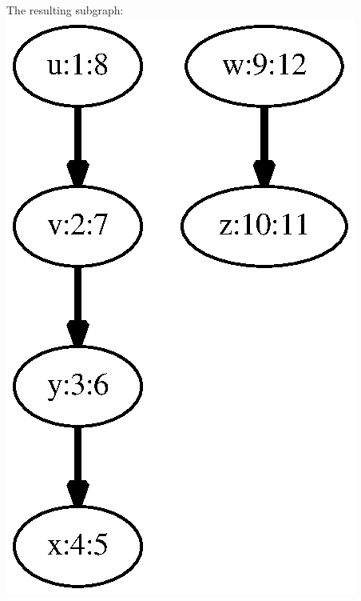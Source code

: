 \documentclass{article}
\begin{document}
\begin{minipage}{0.22727272727272727\linewidth}
The resulting subgraph: 
\includegraphics[width=\linewidth]{clrs_example_dfs_13.eps}
\end{minipage}
\end{document}
